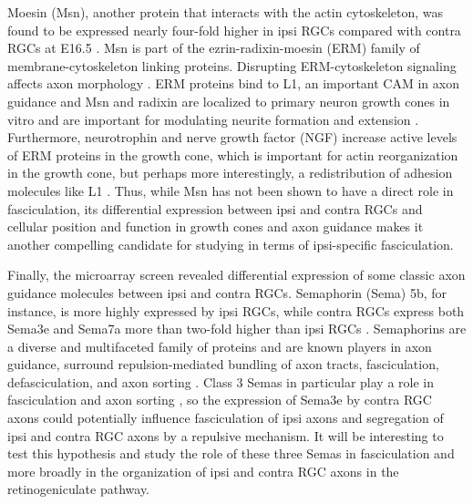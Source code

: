 Moesin (Msn), another protein that interacts with the actin cytoskeleton, was found to be expressed nearly four-fold higher in ipsi RGCs compared with contra RGCs at E16.5 \cite{wang2016ipsilateral}.
Msn is part of the ezrin-radixin-moesin (ERM) family of membrane-cytoskeleton linking proteins.
Disrupting ERM-cytoskeleton signaling affects axon morphology \cite{dickson2002functional,marsick2012activation}.
ERM proteins bind to L1, an important CAM in axon guidance \cite{dickson2002functional,marsick2012activation} and Msn and radixin are localized to primary neuron growth cones in vitro and are important for modulating neurite formation and extension \cite{paglini1998suppression}.
Furthermore, neurotrophin and nerve growth factor (NGF) increase active levels of ERM proteins in the growth cone, which is important for actin reorganization in the growth cone, but perhaps more interestingly, a redistribution of adhesion molecules like L1 \cite{marsick2012activation}.
Thus, while Msn has not been shown to have a direct role in fasciculation, its differential expression between ipsi and contra RGCs and cellular position and function in growth cones and axon guidance makes it another compelling candidate for studying in terms of ipsi-specific fasciculation.

Finally, the microarray screen revealed differential expression of some classic axon guidance molecules between ipsi and contra RGCs.
Semaphorin (Sema) 5b, for instance, is more highly expressed by ipsi RGCs, while contra RGCs express both Sema3e and Sema7a more than two-fold higher than ipsi RGCs \cite{wang2016ipsilateral}.
Semaphorins are a diverse and multifaceted family of proteins and are known players in axon guidance, surround repulsion-mediated bundling of axon tracts, fasciculation, defasciculation, and axon sorting \cite{kuwajima2012optic,tran2007semaphorin,kolodkin2011mechanisms,zhou2013axon,imai2009pre,raper2000semaphorins}.
Class 3 Semas in particular play a role in fasciculation and axon sorting \cite{raper2000semaphorins,zhou2013axon,imai2009pre}, so the expression of Sema3e by contra RGC axons could potentially influence fasciculation of ipsi axons and segregation of ipsi and contra RGC axons by a repulsive mechanism.
It will be interesting to test this hypothesis and study the role of these three Semas in fasciculation and more broadly in the organization of ipsi and contra RGC axons in the retinogeniculate pathway.

